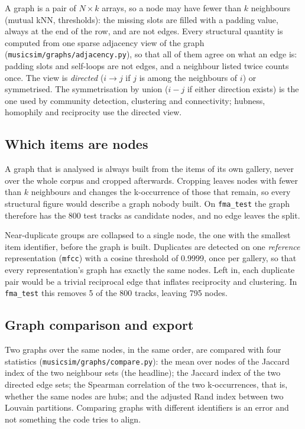A graph is a pair of $N\times k$ arrays, so a node may have fewer than $k$
neighbours (mutual kNN, thresholds): the missing slots are filled with a
padding value, always at the end of the row, and are not edges. Every
structural quantity is computed from one sparse adjacency view of the graph
(\texttt{musicsim/graphs/adjacency.py}), so that all of them agree on what an
edge is: padding slots and self-loops are not edges, and a neighbour listed
twice counts once. The view is \emph{directed} ($i\to j$ if $j$ is among the
neighbours of $i$) or symmetrised. The symmetrisation by union ($i - j$ if
either direction exists) is the one used by community detection, clustering
and connectivity; hubness, homophily and reciprocity use the directed view.

\subsection{Which items are nodes}
\label{sec:graph-gallery}

A graph that is analysed is always built from the items of its own gallery,
never over the whole corpus and cropped afterwards. Cropping leaves nodes with
fewer than $k$ neighbours and changes the k-occurrence of those that remain, so
every structural figure would describe a graph nobody built. On \texttt{fma\_test}
the graph therefore has the 800 test tracks as candidate nodes, and no edge
leaves the split.

Near-duplicate groups are collapsed to a single node, the one with the smallest
item identifier, before the graph is built. Duplicates are detected on one
\emph{reference} representation (\texttt{mfcc}) with a cosine threshold of
0.9999, once per gallery, so that every representation's graph has exactly the
same nodes. Left in, each duplicate pair would be a trivial reciprocal edge that
inflates reciprocity and clustering. In \texttt{fma\_test} this removes 5 of the
800 tracks, leaving 795 nodes.

\subsection{Graph comparison and export}
\label{sec:graph-compare}

Two graphs over the same nodes, in the same order, are compared with four
statistics (\texttt{musicsim/graphs/compare.py}): the mean over nodes of the
Jaccard index of the two neighbour sets (the headline); the Jaccard index of the
two directed edge sets; the Spearman correlation of the two k-occurrences, that
is, whether the same nodes are hubs; and the adjusted Rand index between two
Louvain partitions. Comparing graphs with different identifiers is an error and
not something the code tries to align.

